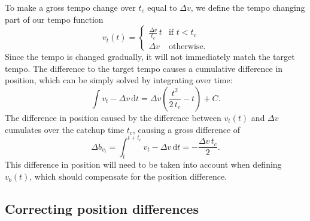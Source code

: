To make a gross tempo change
over $t_c$ equal to $\Delta v$,
we define the tempo changing part of our tempo function
\begin{equation}
v_t(t) =
\begin{cases}
\frac{\Delta v}{t_c} \, t & \text{if } t < t_c \\
\Delta v & \text{otherwise}.
\end{cases}
\end{equation}
Since the tempo is changed gradually,
it will not immediately match the target tempo.
The difference to the target tempo causes
a cumulative difference in position,
which can be simply solved by integrating over time:
\begin{equation}
\label{eq:linear_tempo_change_pos_diff}
\int v_t - \Delta v \, \mathrm{d}t =
\Delta v \left( \frac{t^2}{2 \, t_c} - t \right) + C.
\end{equation}
The difference in position
caused by the difference between $v_t(t)$ and $\Delta v$
cumulates over the catchup time $t_c$,
causing a gross difference of
\begin{equation}
\Delta b_{v_t} =
\int_t^{t + t_c} v_t - \Delta v \, \mathrm{d}t =
-\frac{\Delta v \, t_c }{2}.
\end{equation}
This difference in position will need to be taken into account
when defining $v_b(t)$,
which should compensate for the position difference.

\subsection{Correcting position differences}


